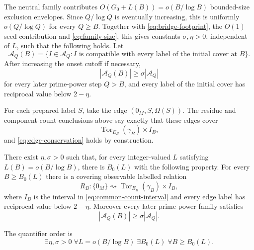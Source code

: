 The neutral family contributes $O(G_0+L(B))=o(B/\log B)$ bounded-size exclusion envelopes.  Since $Q/\log Q$ is eventually increasing, this is uniformly $o(Q/\log Q)$ for every $Q\ge B$.  Together with \eqref{eq:bridge-footprint}, the $O(1)$ seed contribution and \eqref{eq:family-size}, this gives constants $\sigma,\eta>0$, independent of $L$, such that the following holds.  Let
\begin{equation}\label{eq:compatible-subfamily}
\mathcal A_Q(B)
=
\{I\in\mathcal A_Q:I\text{ is compatible with every label of the initial cover at }B\}.
\end{equation}
After increasing the onset cutoff if necessary,
\begin{equation}\label{eq:wide-survivor-fraction}
|\mathcal A_Q(B)|\ge\sigma|\mathcal A_Q|
\end{equation}
for every later prime-power step $Q>B$, and every label of the initial cover has reciprocal value below $2-\eta$.

For each prepared label $S$, take the edge $(0_M,S,\Omega(S))$.  The residue and component-count conclusions above say exactly that these edges cover
\[
\operatorname{Tor}_{E_B}(\gamma_B)\times I_B,
\]
and \eqref{eq:edge-conservation} holds by construction.

\begin{proposition}\label{prop:wide-start}
There exist $\eta,\sigma>0$ such that, for every integer-valued $L$ satisfying $L(B)=o(B/\log B)$, there is $B_0(L)$ with the following property.  For every $B\ge B_0(L)$ there is a covering observable labelled relation
\[
R_B:\{0_M\}\rightsquigarrow
\operatorname{Tor}_{E_B}(\gamma_B)\times I_B,
\]
where $I_B$ is the interval in \eqref{eq:common-count-interval} and every edge label has reciprocal value below $2-\eta$.  Moreover every later prime-power family satisfies
\[
|\mathcal A_Q(B)|\ge\sigma|\mathcal A_Q|.
\]
\end{proposition}

The quantifier order is
\begin{equation}\label{eq:wide-start-quantifiers}
\exists\eta,\sigma>0\;
\forall L=o(B/\log B)\;
\exists B_0(L)\;
\forall B\ge B_0(L).
\end{equation}
